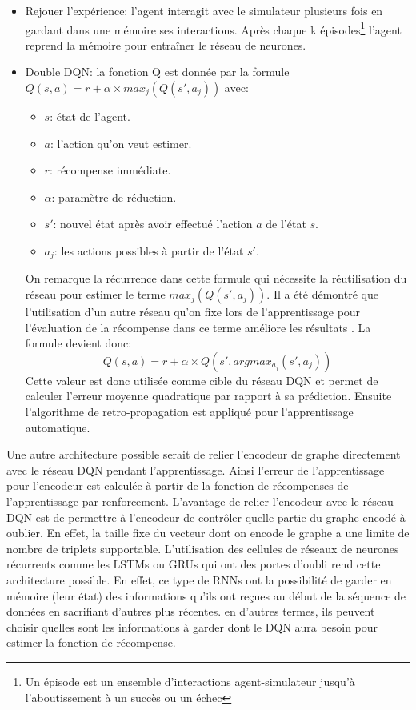 \begin{itemize}
	\item Rejouer l'expérience: l'agent interagit avec le simulateur plusieurs fois en gardant dans une mémoire ses interactions. Après chaque k épisodes\footnote{Un épisode est un ensemble d'interactions agent-simulateur jusqu'à l'aboutissement à un succès ou un échec} l'agent reprend la mémoire pour entraîner le réseau de neurones.
	\item Double DQN: la fonction Q est donnée par la formule $Q(s,a) = r + \alpha \times max_j(Q(s',a_j))$ \citep{Mnih2015} avec:
	\begin{itemize}
		\item $s$: état de l'agent.
		\item $a$: l'action qu'on veut estimer.
		\item $r$: récompense immédiate.
		\item $\alpha$: paramètre de réduction.
		\item $s'$: nouvel état après avoir effectué l'action $a$ de l'état $s$.
		\item $a_j$: les actions possibles à partir de l'état $s'$.
	\end{itemize}
	On remarque la récurrence dans cette formule qui nécessite la réutilisation du réseau pour estimer le terme $max_j (Q(s',a_j))$. Il a été démontré que l'utilisation d'un autre réseau qu'on fixe lors de l'apprentissage pour l'évaluation de la récompense dans ce terme améliore les résultats \citep{Mnih2015}. La formule devient donc: 
	\[Q(s,a) = r + \alpha \times Q(s',argmax_{a_j}(s',a_j))\]
	Cette valeur est donc utilisée comme cible du réseau DQN et permet de calculer l'erreur moyenne quadratique par rapport à sa prédiction. Ensuite l'algorithme de retro-propagation est appliqué pour l'apprentissage automatique.
\end{itemize}
Une autre architecture possible serait de relier l'encodeur de graphe directement avec le réseau DQN pendant l'apprentissage. Ainsi l'erreur de l'apprentissage pour l'encodeur est calculée à partir de la fonction de récompenses de l'apprentissage par renforcement. L'avantage de relier l'encodeur avec le réseau DQN est de permettre à l'encodeur de contrôler quelle partie du graphe encodé à oublier. En effet, la taille fixe du vecteur dont on encode le graphe a une limite de nombre de triplets supportable. L'utilisation des cellules de réseaux de neurones récurrents comme les LSTMs ou GRUs qui ont des portes d'oubli rend cette architecture possible. En effet, ce type de RNNs ont la possibilité de garder en mémoire (leur état) des informations qu'ils ont reçues au début de la séquence de données en sacrifiant d'autres plus récentes. en d'autres termes, ils peuvent choisir quelles sont les informations à garder dont le DQN aura besoin pour estimer la fonction de récompense.
